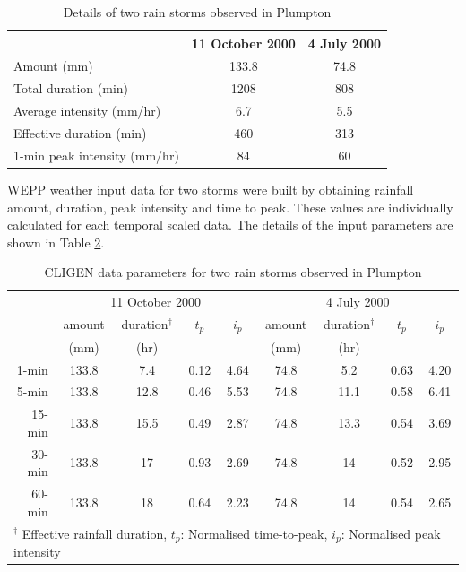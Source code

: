 \begin{table}[htbp]
  \centering
  \small
  \caption{Details of two rain storms observed in Plumpton}
  \label{tab:DetailsoftworainstormsobservedinPlumpton}
    \begin{tabular}{lcc}
    \toprule
     & 11 October 2000 & 4 July 2000 \\
    \midrule
    Amount (mm) & 133.8 & 74.8\\
    Total duration (min) & 1208 & 808 \\
    Average intensity (mm/hr) & 6.7 & 5.5 \\
    Effective duration (min) & 460 & 313 \\
    1-min peak intensity (mm/hr) & 84 & 60 \\
    \bottomrule
    \end{tabular}
\end{table}

WEPP weather input data for two storms were built by obtaining rainfall amount,
duration, peak intensity and time to peak. These values are individually
calculated for each temporal scaled data. The details of the input parameters
are shown in Table \ref{tab:CLIGENWEPPInputFileParameters}.

\begin{table}[htbp]
  \centering
  \small
  \caption{CLIGEN data parameters for two rain storms observed in
Plumpton}
  \label{tab:CLIGENWEPPInputFileParameters}
    \begin{tabular}{rcccccccc} \toprule
       & \multicolumn{4}{c}{11 October 2000} &
\multicolumn{4}{c}{4 July 2000}\\
       \cmidrule(r){2-5} \cmidrule(l){6-9}
       & amount & duration$^{\dagger}$ & $t_p$ & $i_p$ & amount &
duration$^{\dagger}$ & $t_p$ & $i_p$\\
       & \scriptsize(mm) & \scriptsize(hr) & & & \scriptsize(mm) &
\scriptsize(hr) & & \\
       \midrule
      1-min  & 133.8 & 7.4  & 0.12 & 4.64 & 74.8 & 5.2  & 0.63 & 4.20\\
      5-min  & 133.8 & 12.8 & 0.46 & 5.53 & 74.8 & 11.1 & 0.58 & 6.41\\
      15-min & 133.8 & 15.5 & 0.49 & 2.87 & 74.8 & 13.3 & 0.54 & 3.69\\
      30-min & 133.8 & 17   & 0.93 & 2.69 & 74.8 & 14   & 0.52 & 2.95\\
      60-min & 133.8 & 18   & 0.64 & 2.23 & 74.8 & 14   & 0.54 & 2.65\\
      \bottomrule
      \multicolumn{9}{l}{\footnotesize $^\dagger$ Effective rainfall
duration, {\normalsize{$t_p$}}: Normalised time-to-peak, {\normalsize{$i_p$}}:
Normalised peak intensity}
    \end{tabular}
\end{table}

